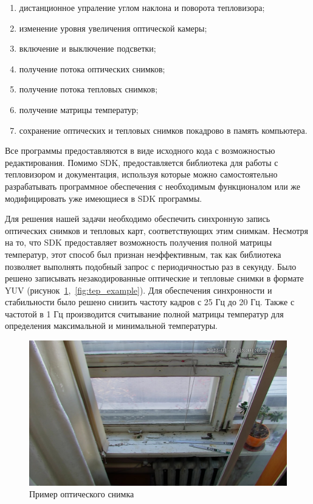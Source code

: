\documentclass[14pt, a4paper]{extreport}
\begin{document}
	\begin{enumerate}[label={\arabic*)}]
		\item дистанционное упраление углом наклона и поворота тепловизора;
		\item изменение уровня увеличения оптической камеры;
		\item включение и выключение подсветки;
		\item получение потока оптических снимков;
		\item получение потока тепловых снимков;
		\item получение матрицы температур;
		\item сохранение оптических и тепловых снимков покадрово в память компьютера.
	\end{enumerate}

	Все программы предоставляются в виде исходного кода с возможностью редактирования. Помимо SDK, предоставляется библиотека для работы с тепловизором и документация, используя которые можно самостоятельно разрабатывать программное обеспечения с необходимым функционалом или же модифицировать уже имеющиеся в SDK программы.
	
	Для решения нашей задачи необходимо обеспечить синхронную запись оптических снимков и тепловых карт, соответствующих этим снимкам. Несмотря на то, что SDK предоставляет возможность получения полной матрицы температур, этот способ был признан неэффективным, так как библиотека позволяет выполнять подобный запрос с периодичностью раз в секунду. Было решено записывать незакодированные оптические и тепловые снимки в формате YUV (рисунок~\ref{fig:opt_example},~\ref{fig:tep_example}). Для обеспечения синхронности и стабильности было решено снизить частоту кадров с 25 Гц до 20 Гц. Также с частотой в 1 Гц производится считывание полной матрицы температур для определения максимальной и минимальной температуры. 
	
	\begin{figure}[h!]
		\centering
		\includegraphics[width = 13cm]{image/chapter_2/opt_example}	
		\caption{Пример оптического снимка}
		\label{fig:opt_example}
	\end{figure}
\end{document}
